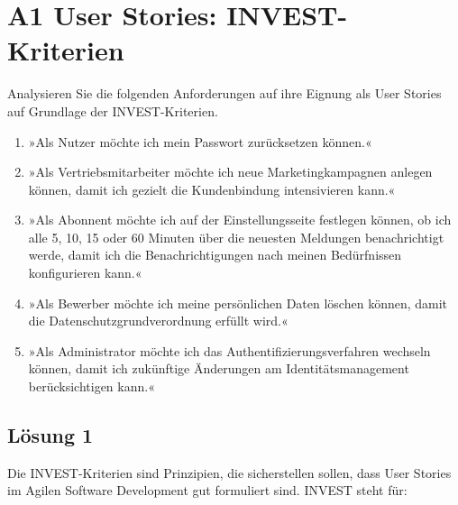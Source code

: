 \documentclass[main.tex]{subfiles}
\begin{document}
\section{A1 User Stories: INVEST-Kriterien}

Analysieren Sie die folgenden Anforderungen auf ihre Eignung als User Stories auf Grundlage der INVEST-Kriterien.
\begin{enumerate}
\item »Als Nutzer möchte ich mein Passwort zurücksetzen können.«
\item »Als Vertriebsmitarbeiter möchte ich neue Marketingkampagnen anlegen können, damit ich gezielt die Kundenbindung intensivieren kann.«
\item »Als Abonnent möchte ich auf der Einstellungsseite festlegen können, ob ich alle 5, 10, 15 oder 60 Minuten über die neuesten Meldungen benachrichtigt werde, damit ich die Benachrichtigungen nach meinen Bedürfnissen konfigurieren kann.«
\item »Als Bewerber möchte ich meine persönlichen Daten löschen können, damit die Datenschutzgrundverordnung erfüllt wird.«
\item »Als Administrator möchte ich das Authentifizierungsverfahren wechseln können, damit ich zukünftige Änderungen am Identitätsmanagement berücksichtigen kann.«
\end{enumerate}

\subsection{Lösung 1}

Die INVEST-Kriterien sind Prinzipien, die sicherstellen sollen, dass User Stories im Agilen Software Development gut formuliert sind.
INVEST steht für:
\end{document}
